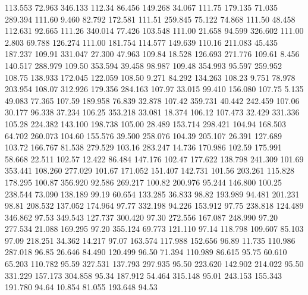  113.553   72.963  346.133       112.34
  86.456  149.268   34.067       111.75
 179.135   71.035  289.394       111.60
   9.460   82.792  172.581       111.51
 259.845   75.122   74.868       111.50
  48.458  112.631   92.665       111.26
 340.014   77.426  103.548       111.00
  21.658   94.599  326.602       111.00
   2.803   69.788  126.274       111.00
 181.754  114.577  149.639       110.16
 211.083   45.435  187.237       109.91
 331.047   27.300   47.963       109.84
  18.528  126.693  271.776       109.61
   8.456  140.517  288.979       109.50
 353.594   39.458   98.987       109.48
 354.993   95.597  259.952       108.75
 138.933  172.045  122.059       108.50
   9.271   84.292  134.263       108.23
   9.751   78.978  203.954       108.07
 312.926  179.356  284.163       107.97
  33.015   99.410  156.080       107.75
   5.135   49.083   77.365       107.59
 189.958   76.839   32.878       107.42
 359.731   40.442  242.459       107.06
  30.177   96.338   37.234       106.25
 353.218   33.081   18.374       106.12
 107.473   32.429  331.336       105.28
 224.382  143.100  198.738       105.00
  28.489  153.714  298.421       104.94
 168.503   64.702  260.073       104.60
 155.576   39.500  258.076       104.39
 205.107   26.391  127.689       103.72
 166.767   81.538  279.529       103.16
 283.247   14.736  170.986       102.59
 175.991   58.668   22.511       102.57
  12.422   86.484  147.176       102.47
 177.622  138.798  241.309       101.69
 353.441  108.260  277.029       101.67
 171.052  151.407  142.731       101.56
 203.261  115.828  178.295       100.87
 356.920   92.586  269.217       100.82
 200.976   95.244  146.800       100.25
 238.544   73.090  138.189        99.19
  60.654  133.285   36.833        98.82
 193.989   94.481  201.231        98.81
 208.532  137.052  174.964        97.77
 332.198   94.226  153.912        97.75
 238.818  124.489  346.862        97.53
 349.543  127.737  300.420        97.30
 272.556  167.087  248.990        97.20
 277.534   21.088  169.295        97.20
 355.124   69.773  121.110        97.14
 118.798  109.607   85.103        97.09
 218.251   34.362   14.217        97.07
 163.574  117.988  152.656        96.89
  11.735  110.986  287.018        96.85
  26.646   84.490  120.499        96.50
  71.394  110.989   86.615        95.75
  60.610   65.203  110.782        95.59
 327.531  137.793  297.935        95.50
 223.620  142.902  214.022        95.50
 331.229  157.173  304.858        95.34
 187.912   54.464  315.148        95.01
 243.153  155.343  191.780        94.64
  10.854   81.055  193.648        94.53
